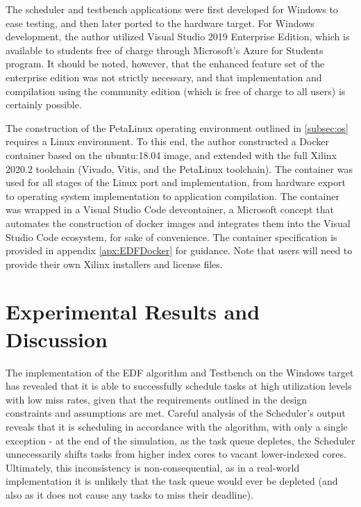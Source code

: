 The scheduler and testbench applications were first developed for Windows to ease testing, and then later ported to the hardware target. For Windows development, the author utilized Visual Studio 2019 Enterprise Edition, which is available to students free of charge through Microsoft's Azure for Students program. It should be noted, however, that the enhanced feature set of the enterprise edition was not strictly necessary, and that implementation and compilation using the community edition (which is free of charge to all users) is certainly possible.

The construction of the PetaLinux operating environment outlined in \ref{subsec:os} requires a Linux environment. To this end, the author constructed a Docker container based on the ubuntu:18.04 image, and extended with the full Xilinx 2020.2 toolchain (Vivado, Vitis, and the PetaLinux toolchain). The container was used for all stages of the Linux port and implementation, from hardware export to operating system implementation to application compilation. The container was wrapped in a Visual Studio Code devcontainer, a Microsoft concept that automates the construction of docker images and integrates them into the Visual Studio Code ecosystem, for sake of convenience. The container specification is provided in appendix \ref{apx:EDFDocker} for guidance. Note that users will need to provide their own Xilinx installers and license files.

\section{Experimental Results and Discussion}\label{sec:findings}
The implementation of the EDF algorithm and Testbench on the Windows target has revealed that it is able to successfully schedule tasks at high utilization levels with low miss rates, given that the requirements outlined in the design constraints and assumptions are met. Careful analysis of the Scheduler's output reveals that it is scheduling in accordance with the algorithm, with only a single exception - at the end of the simulation, as the task queue depletes, the Scheduler unnecessarily shifts tasks from higher index cores to vacant lower-indexed cores. Ultimately, this inconsistency is non-consequential, as in a real-world implementation it is unlikely that the task queue would ever be depleted (and also as it does not cause any tasks to miss their deadline).

